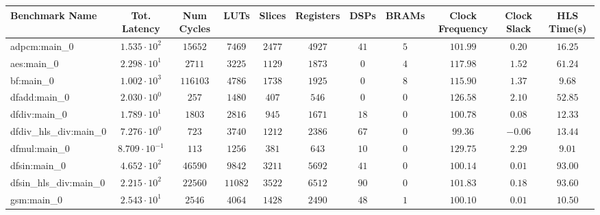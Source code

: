 \begin{tabular}{|l|c|c|c|c|c|c|c|c|c|c|}
\hline
Benchmark Name          & Tot. Latency            & Num Cycles & LUTs      & Slices    & Registers & DSPs    & BRAMs  & Clock Frequency & Clock Slack & HLS Time(s) \\
\hline
adpcm:main\_0           & $ 1.535 \cdot 10^{2}  $ & $ 15652  $ & $ 7469  $ & $ 2477  $ & $ 4927  $ & $ 41  $ & $ 5  $ & $ 101.99      $ & $ 0.20    $ & $ 16.25   $ \\
aes:main\_0             & $ 2.298 \cdot 10^{1}  $ & $ 2711   $ & $ 3225  $ & $ 1129  $ & $ 1873  $ & $ 0   $ & $ 4  $ & $ 117.98      $ & $ 1.52    $ & $ 61.24   $ \\
bf:main\_0              & $ 1.002 \cdot 10^{3}  $ & $ 116103 $ & $ 4786  $ & $ 1738  $ & $ 1925  $ & $ 0   $ & $ 8  $ & $ 115.90      $ & $ 1.37    $ & $ 9.68    $ \\
dfadd:main\_0           & $ 2.030 \cdot 10^{0}  $ & $ 257    $ & $ 1480  $ & $ 407   $ & $ 546   $ & $ 0   $ & $ 0  $ & $ 126.58      $ & $ 2.10    $ & $ 52.85   $ \\
dfdiv:main\_0           & $ 1.789 \cdot 10^{1}  $ & $ 1803   $ & $ 2816  $ & $ 945   $ & $ 1671  $ & $ 18  $ & $ 0  $ & $ 100.78      $ & $ 0.08    $ & $ 12.33   $ \\
dfdiv\_hls\_div:main\_0 & $ 7.276 \cdot 10^{0}  $ & $ 723    $ & $ 3740  $ & $ 1212  $ & $ 2386  $ & $ 67  $ & $ 0  $ & $ 99.36       $ & $ -0.06   $ & $ 13.44   $ \\
dfmul:main\_0           & $ 8.709 \cdot 10^{-1} $ & $ 113    $ & $ 1256  $ & $ 381   $ & $ 643   $ & $ 10  $ & $ 0  $ & $ 129.75      $ & $ 2.29    $ & $ 9.01    $ \\
dfsin:main\_0           & $ 4.652 \cdot 10^{2}  $ & $ 46590  $ & $ 9842  $ & $ 3211  $ & $ 5692  $ & $ 41  $ & $ 0  $ & $ 100.14      $ & $ 0.01    $ & $ 93.00   $ \\
dfsin\_hls\_div:main\_0 & $ 2.215 \cdot 10^{2}  $ & $ 22560  $ & $ 11082 $ & $ 3522  $ & $ 6512  $ & $ 90  $ & $ 0  $ & $ 101.83      $ & $ 0.18    $ & $ 93.60   $ \\
gsm:main\_0             & $ 2.543 \cdot 10^{1}  $ & $ 2546   $ & $ 4064  $ & $ 1428  $ & $ 2490  $ & $ 48  $ & $ 1  $ & $ 100.10      $ & $ 0.01    $ & $ 10.50   $ \\

\end{tabular}
